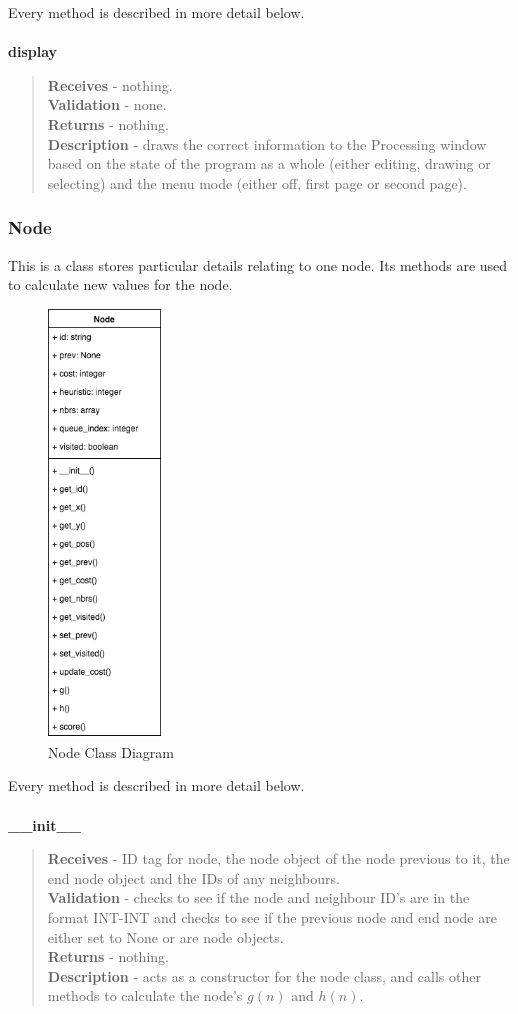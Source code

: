 \documentclass[titlepage]{article}
\begin{document}
Every method is described in more detail below. \\\\

\textbf{display}
\begin{quote}
\textbf{Receives} - nothing. \\
\textbf{Validation} - none.\\
\textbf{Returns} - nothing. \\
\textbf{Description} - draws the correct information to the Processing window based on the state of the program as a whole (either editing, drawing or selecting) and the menu mode (either off, first page or second page).
\end{quote}

\subsubsection{Node}
This is a class stores particular details relating to one node. Its methods are used to calculate new values for the node.

\begin{figure}[H]
  \centering
  \includegraphics[width=3cm]{nodecd.png}
  \caption{Node Class Diagram}
  \label{fig:dijk}
\end{figure}

Every method is described in more detail below. \\\\

\textbf{\_\_init\_\_}
\begin{quote}
\textbf{Receives} - ID tag for node, the node object of the node previous to it, the end node object and the IDs of any neighbours. \\
\textbf{Validation} - checks to see if the node and neighbour ID's are in the format INT-INT and checks to see if the previous node and end node are either set to None or are node objects.\\
\textbf{Returns} - nothing. \\
\textbf{Description} - acts as a constructor for the node class, and calls other methods to calculate the node's $g(n)$ and $h(n)$.
\end{quote}
\end{document}

